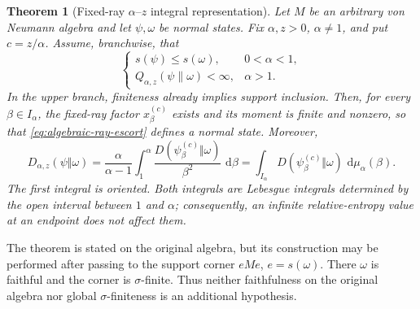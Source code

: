 \documentclass[12pt]{article}
\numberwithin{equation}{section}
\newtheorem{theorem}{Theorem}[section]
\theoremstyle{definition}
\theoremstyle{remark}
\newcommand{\dd}{\,\mathrm d}
\newcommand{\?}{\overset{?}{=}}
\begin{document}
\begin{theorem}[Fixed-ray $\alpha$--$z$ integral representation]
\label{thm:fixed-ray-integral}
Let $M$ be an arbitrary von Neumann algebra and let $\psi,\omega$ be
normal states.  Fix $\alpha,z>0$, $\alpha\ne1$, and put $c=z/\alpha$.
Assume, branchwise, that
\begin{equation}
  \begin{cases}
  s(\psi)\leq s(\omega),&0<\alpha<1,\\
  Q_{\alpha,z}(\psi\|\omega)<\infty,&\alpha>1.
  \end{cases}
  \label{eq:main-branchwise-hypotheses}
\end{equation}
In the upper branch, finiteness already implies support inclusion.  Then,
for every $\beta\in I_\alpha$, the fixed-ray factor $x_\beta^{(c)}$ exists
and its moment is finite and nonzero, so that
\eqref{eq:algebraic-ray-escort} defines a normal state.  Moreover,
\begin{equation}
  D_{\alpha,z}(\psi\Vert\omega)
  =\frac{\alpha}{\alpha-1}
   \int_1^\alpha
   \frac{D(\psi_\beta^{(c)}\Vert\omega)}{\beta^2}
   \,\dd\beta
  =\int_{I_\alpha}
   D(\psi_\beta^{(c)}\Vert\omega)\,
   \dd\mu_\alpha(\beta).
  \label{eq:main-fixed-ray-integral}
\end{equation}
The first integral is oriented.  Both integrals are Lebesgue integrals
determined by the open interval between $1$ and $\alpha$; consequently, an
infinite relative-entropy value at an endpoint does not affect them.
\end{theorem}

The theorem is stated on the original algebra, but its construction may be
performed after passing to the support corner
$eMe$, $e=s(\omega)$.  There $\omega$ is faithful and the corner is
$\sigma$-finite.  Thus neither faithfulness on the original algebra nor
global $\sigma$-finiteness is an additional hypothesis.
\end{document}
